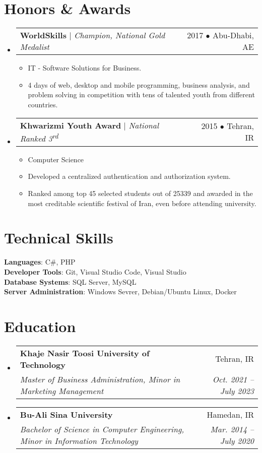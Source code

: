 \documentclass[letterpaper,11pt]{article}
\makeatletter
\newcommand{\resumeItem}[1]{
  \item\small{
    {#1 \vspace{-2pt}}
  }
}
\newcommand{\resumeSubheading}[4]{
  \vspace{-2pt}\item
    \begin{tabular*}{0.97\textwidth}[t]{l@{\extracolsep{\fill}}r}
      \textbf{#1} & #2 \\
      \textit{\small#3} & \textit{\small #4} \\
    \end{tabular*}\vspace{-7pt}
}
\newcommand{\resumeProjectHeading}[2]{
    \item
    \begin{tabular*}{0.97\textwidth}{l@{\extracolsep{\fill}}r}
      \small#1 & #2 \\
    \end{tabular*}\vspace{-7pt}
}
\newcommand{\resumeSubHeadingListStart}{\begin{itemize}[leftmargin=0.15in, label={}]}
\newcommand{\resumeSubHeadingListEnd}{\end{itemize}}
\newcommand{\resumeItemListStart}{\begin{itemize}}
\newcommand{\resumeItemListEnd}{\end{itemize}\vspace{-5pt}}
\makeatother
\begin{document}
\section{Honors \& Awards}
    \resumeSubHeadingListStart
      \resumeProjectHeading
          {\textbf{WorldSkills} $|$ \emph{Champion, National Gold Medalist}}{2017 $\bullet$ Abu-Dhabi, AE}
          \resumeItemListStart
            \resumeItem{IT - Software Solutions for Business.}
            \resumeItem{4 days of web, desktop and mobile programming, business analysis, and problem solving in competition with tens of talented youth from different countries.}
          \resumeItemListEnd
      \resumeProjectHeading
          {\textbf{Khwarizmi Youth Award} $|$ \emph{National Ranked 3\textsuperscript{rd}}}{2015 $\bullet$ Tehran, IR}
          \resumeItemListStart
            \resumeItem{Computer Science}
            \resumeItem{Developed a centralized authentication and authorization system.}
            \resumeItem{Ranked among top 45 selected students out of 25339 and awarded in the most creditable scientific festival of Iran, even before attending university.}
          \resumeItemListEnd
    \resumeSubHeadingListEnd


\section{Technical Skills}
 \begin{itemize}[leftmargin=0.15in, label={}]
    \small{\item{
     \textbf{Languages}{: C\#, PHP} \\
     \textbf{Developer Tools}{: Git, Visual Studio Code, Visual Studio} \\
     \textbf{Database Systems}{: SQL Server, MySQL} \\
     \textbf{Server Administration}{: Windows Sevrer, Debian/Ubuntu Linux, Docker} \\
    }}
 \end{itemize}


\section{Education}
  \resumeSubHeadingListStart
    \resumeSubheading
      {Khaje Nasir Toosi University of Technology}{Tehran, IR}
      {Master of Business Administration, Minor in Marketing Management}{Oct. 2021 -- July 2023}
    \resumeSubheading
      {Bu-Ali Sina University}{Hamedan, IR}
      {Bachelor of Science in Computer Engineering, Minor in Information Technology}{Mar. 2014 -- July 2020}
  \resumeSubHeadingListEnd

\end{document}
